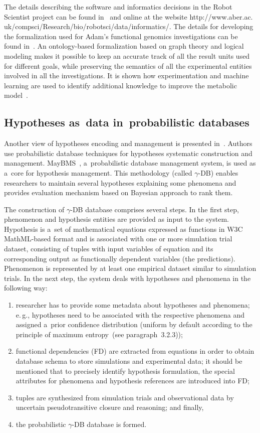 \begin{multicols}{2}
  The details describing the software and informatics decisions in the Robot Scientist
project can be found in~\cite{45-kl, 53-kl} and online at the website {\sf
http://www.aber.ac. uk/compsci/Research/bio/robotsci/data/informatics/}. The details
for developing the formalization used for Adam's functional genomics investigations
can be found in~\cite{48-kl, 54-kl}. An ontology-based formalization based on graph
theory and logical modeling makes it possible to keep an accurate track of all the
result units used for different goals, while preserving the semantics of all the
experimental entities involved in all the investigations. It is shown how
experimentation and machine learning are used to identify additional knowledge to
improve the metabolic model~\cite{54-kl}.

\subsection{Hypotheses as~data in~probabilistic databases}

\noindent
  Another view of hypotheses encoding and management is presented
  in~\cite{55-kl}. Authors use probabilistic database techniques for hypotheses
systematic construction and management. MayBMS~\cite{56-kl}, a~probabilistic
database management system, is used as a~core for hypothesis management. This
methodology (called $\gamma$-DB) enables researchers to maintain several
hypotheses explaining some phenomena and provides evaluation mechanism based
on Bayesian approach to rank them.

  The construction of $\gamma$-DB database comprises several steps. In the first
step, phenomenon and hypothesis entities are provided as input to the system.
Hypothesis is a~set of mathematical equations expressed as functions in W3C
MathML-based format and is associated with one or more simulation trial dataset,
consisting of tuples with input variables of equation and its corresponding output as
functionally dependent variables (the predictions). Phenomenon is represented
by at least one empirical dataset similar to simulation trials. In the next step, the
system deals with hypotheses  and phenomena in the following way:
\begin{enumerate}[(1)]
\item researcher
has to provide some metadata about hypotheses and phenomena; e.\,g., hypotheses
need to be associated with the respective phenomena and assigned a~prior confidence
distribution (uniform by default according to the principle of maximum
entropy~(see paragraph~3.2.3));
\item functional dependencies (FD) are extracted from equations in
order to obtain database schema to store simulations and experimental data; it should
be mentioned that to precisely identify hypothesis formulation, the special attributes
for phenomena and hypothesis references are introduced into FD;
\item tuples are
synthesized from simulation trials and observational data by uncertain
  pseudotransitive closure and  reasoning; and finally,
  \item  the probabilistic
  $\gamma$-DB database is formed.
  \end{enumerate}


\end{multicols}
